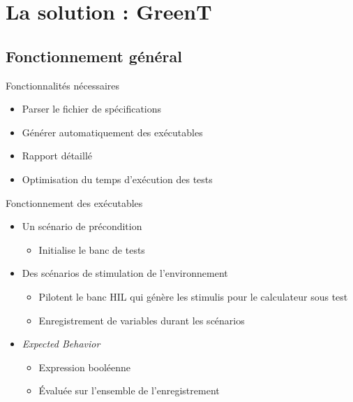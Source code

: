 \documentclass{beamer}
\begin{document}
\section{La solution : GreenT}
\subsection{Fonctionnement g\'en\'eral}
\begin{frame}{Fonctionnalités nécessaires}
\vspace{-10px}
	\begin{itemize}
		\item Parser le fichier de spécifications
		\item Générer automatiquement des  exécutables 
		\item Rapport détaillé
		\item Optimisation du temps d'exécution des tests
	\end{itemize}


\end{frame}
\begin{frame}{Fonctionnement des exécutables}
	\begin{itemize}
	  \vfill
		\item Un scénario de précondition
		\begin{itemize}
			\item Initialise le banc de tests
		\end{itemize}
		\pause
	\vfill
		\item Des scénarios de stimulation de l'environnement
			\begin{itemize}
			\item Pilotent le banc HIL qui génère les stimulis pour le calculateur sous test
			\item Enregistrement de variables durant les scénarios
			\end{itemize}
			\pause
	\vfill
		\item \textit{Expected Behavior }
			\begin{itemize}
				\item Expression booléenne
				\item Évaluée sur l'ensemble de l'enregistrement
			\end{itemize}
	\vfill
	\end{itemize}
\end{frame}
\end{document}
